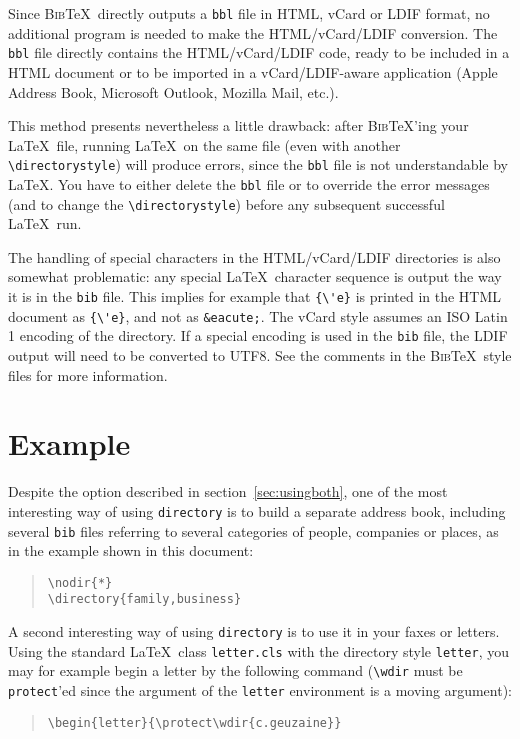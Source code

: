 \documentclass[10pt]{article}
\newcommand{\BibTeX}{\textsc{Bib}\TeX}
\begin{document}
Since \BibTeX\ directly outputs a \texttt{bbl} file in HTML, vCard or LDIF
format, no additional program is needed to make the HTML/vCard/LDIF
conversion. The \texttt{bbl} file directly contains the HTML/vCard/LDIF
code, ready to be included in a HTML document or to be imported in a
vCard/LDIF-aware application (Apple Address Book, Microsoft Outlook, Mozilla
Mail, etc.).

This method presents nevertheless a little drawback: after \BibTeX'ing your
\LaTeX\ file, running \LaTeX\ on the same file (even with another
\verb|\directorystyle|) will produce errors, since the \texttt{bbl} file is
not understandable by \LaTeX. You have to either delete the \texttt{bbl}
file or to override the error messages (and to change the
\verb|\directorystyle|) before any subsequent successful \LaTeX\ run.

The handling of special characters in the HTML/vCard/LDIF directories is
also somewhat problematic: any special \LaTeX\ character sequence is output
the way it is in the \texttt{bib} file. This implies for example that
\verb|{\'e}| is printed in the HTML document as \verb|{\'e}|, and not as
\verb|&eacute;|. The vCard style assumes an ISO Latin 1 encoding of the
directory. If a special encoding is used in the \texttt{bib} file, the LDIF
output will need to be converted to UTF8. See the comments in the \BibTeX\
style files for more information.

\section{Example}
\label{sec:example}

Despite the option described in section~\ref{sec:usingboth}, one of the most
interesting way of using \texttt{directory} is to build a separate address
book, including several \texttt{bib} files referring to several categories of
people, companies or places, as in the example shown in this document:
\begin{quote}
\verb|\nodir{*}| \\
\verb|\directory{family,business}|
\end{quote}

A second interesting way of using \texttt{directory} is to use it in your faxes
or letters. Using the standard \LaTeX\ class \texttt{letter.cls} with the
directory style \texttt{letter}, you may for example begin a letter by the
following command (\verb'\wdir' must be \texttt{protect}'ed since the argument
of the \texttt{letter} environment is a moving argument):
\begin{quote}
\verb'\begin{letter}{\protect\wdir{c.geuzaine}}'
\end{quote}
\end{document}
